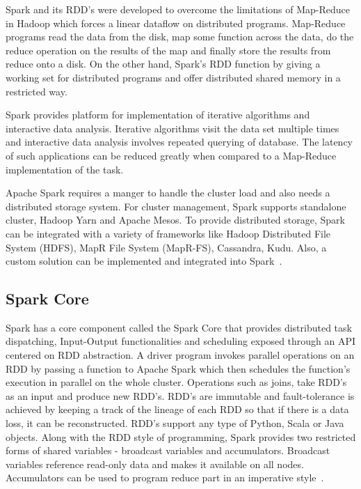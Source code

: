 Spark and its RDD's were developed to overcome the limitations of Map-Reduce in 
Hadoop which forces a linear dataflow on distributed programs. Map-Reduce 
programs read the data from the disk, map some function across the data, do the 
reduce operation on the results of the map and finally store the results from 
reduce onto a disk. On the other hand, Spark's RDD function by giving a working 
set for distributed programs and offer distributed shared memory in a restricted
way. 

Spark provides platform for implementation of iterative algorithms and 
interactive data analysis. Iterative algorithms visit the data set multiple 
times and interactive data analysis involves repeated querying of database. 
The latency of such applications can be reduced greatly when compared to a 
Map-Reduce implementation of the task. 

Apache Spark requires  a manger to handle the cluster load and also needs a 
distributed storage system. For cluster management, Spark supports standalone 
cluster, Hadoop Yarn and Apache Mesos. To provide distributed storage, Spark 
can be integrated with a variety of frameworks like Hadoop Distributed File 
System (HDFS), MapR File System (MapR-FS), Cassandra, Kudu. Also, a custom 
solution can be implemented and integrated into Spark~\cite{hid-sp18-408-Spark}. 

\subsection{Spark Core}
Spark has a core component called the Spark Core that provides distributed task 
dispatching, Input-Output functionalities and scheduling exposed through an API 
centered on RDD abstraction. A driver program invokes parallel operations on an 
RDD by passing a function to Apache Spark which then schedules the function's 
execution in parallel on the whole cluster. Operations such as joins, take RDD's 
as an input and produce new RDD's. RDD's are immutable and fault-tolerance is 
achieved by keeping a track of the lineage of each RDD so that if there is a 
data loss, it can be reconstructed. RDD's support any type of Python, Scala or 
Java objects. Along with the RDD style of programming, Spark provides two 
restricted forms of shared variables - broadcast variables and accumulators. 
Broadcast variables reference read-only data and makes it available on all 
nodes. Accumulators can be used to program reduce part in an imperative style~\cite{hid-sp18-408-Spark}. 

